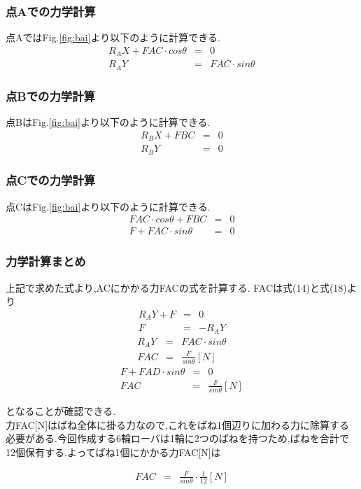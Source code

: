 \documentclass[a4paper]{jarticle}
\begin{document}
\subsubsection{点Aでの力学計算}
点AではFig.\ref{fig:bai}より以下のように計算できる.
\begin{eqnarray}
	R_AX+FAC\cdot cosθ & = & 0 \\
	R_AY & = & FAC\cdot sinθ 
\end{eqnarray}
\subsubsection{点Bでの力学計算}
点BはFig.\ref{fig:bai}より以下のように計算できる.
\begin{eqnarray}
	R_BX+FBC & = & 0 \\
	R_BY & = & 0
\end{eqnarray}
\subsubsection{点Cでの力学計算}
点CはFig.\ref{fig:bai}より以下のように計算できる.
\begin{eqnarray}
	FAC\cdot cosθ+FBC & = & 0 \\
	F+FAC\cdot sinθ & = & 0
\end{eqnarray}
\subsubsection{力学計算まとめ}
上記で求めた式より,ACにかかる力FACの式を計算する.
FACは式(14)と式(18)より
\begin{eqnarray}
	R_AY+F & = & 0 \\
		F & = & -R_AY 
\end{eqnarray}
\begin{eqnarray}
	　　　　R_AY & = & FAC\cdot sinθ \\
		FAC & = & \frac{F}{sinθ} [N] 
\end{eqnarray}
\begin{eqnarray}
	F+FAD\cdot sinθ & = & 0 \\
	FAC & = & \frac{F}{sinθ} [N]
\end{eqnarray}

となることが確認できる.　\\
力FAC[N]はばね全体に掛る力なので,これをばね1個辺りに加わる力に除算する必要がある.今回作成する6輪ローバは1輪に2つのばねを持つため,ばねを合計で12個保有する.よってばね1個にかかる力FAC[N]は

\begin{eqnarray}
	FAC & = & \frac{F}{sinθ}\cdot \frac{1}{12} [N]
\end{eqnarray}
\end{document}
